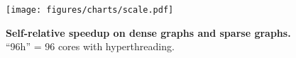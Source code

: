 \begin{figure}[t]
  \centering
  \texttt{[image: figures/charts/scale.pdf]}
  \caption{\textbf{Self-relative speedup on dense graphs and sparse graphs.}
  ``96h'' = 96 cores with hyperthreading.
  }\label{fig:scalability}
\end{figure}
